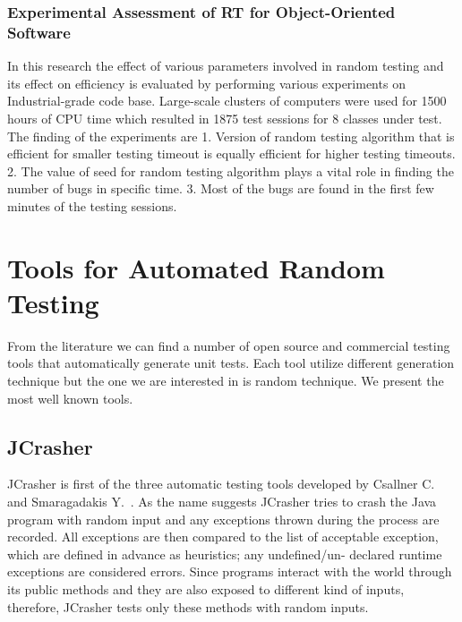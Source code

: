 \subsubsection{Experimental Assessment of RT for Object-Oriented Software}
In this research the effect of various parameters involved in random testing and its effect on efficiency is evaluated by performing various experiments on Industrial-grade code base. Large-scale clusters of computers were used for 1500 hours of CPU time which resulted in 1875 test sessions for 8 classes under test.~\cite{Ciupa2007} The finding of the experiments are 1. Version of random testing algorithm that is efficient for smaller testing timeout is equally efficient for higher testing timeouts. 2. The value of seed for random testing algorithm plays a vital role in finding the number of bugs in specific time. 3. Most of the bugs are found in the first few minutes of the testing sessions.


\section{Tools for Automated Random Testing}
From the literature we can find a number of open source and commercial testing tools that automatically generate unit tests. Each tool utilize different generation technique but the one we are interested in is random technique. We present the most well known tools.


\subsection{JCrasher}

JCrasher is first of the three automatic testing tools developed by Csallner C. and Smaragadakis Y.~\cite{Pacheco2007b}. As the name suggests JCrasher tries to crash the Java program with random input and any exceptions thrown during the process are recorded. All exceptions are then compared to the list of acceptable exception, which are defined in advance as heuristics; any undefined/un- declared runtime exceptions are considered errors. Since programs interact with the world through its public methods and they are also exposed to different kind of inputs, therefore, JCrasher tests only these methods with random inputs.


